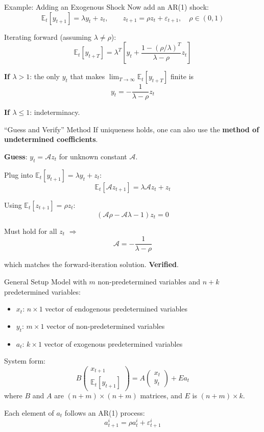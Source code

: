 \documentclass[blue]{beamer}
\newcommand{\E}{\mathbb{E}}
\begin{document}
\begin{frame}{Example: Adding an Exogenous Shock}
	Now add an AR(1) shock:
	\[
	\E_t[y_{t+1}] = \lambda y_t + z_t, \qquad z_{t+1} = \rho z_t + \varepsilon_{t+1}, \quad \rho \in (0, 1)
	\]
	
	\bigskip
	Iterating forward (assuming $\lambda \neq \rho$):
	\[
	\E_t[y_{t+T}] = \lambda^T \left[y_t + \frac{1 - (\rho/\lambda)^T}{\lambda - \rho} z_t\right]
	\]
	
	\bigskip
	\textbf{If $\lambda > 1$}: the only $y_t$ that makes $\lim_{T\rightarrow \infty} \E_t[y_{t+T}]$ finite is
	\[
	y_t = -\frac{1}{\lambda - \rho} z_t
	\]
	
	\textbf{If $\lambda \leq 1$}: indeterminacy.
\end{frame}


\begin{frame}{``Guess and Verify'' Method}
	If uniqueness holds, one can also use the \textbf{method of undetermined coefficients}.
	
	\bigskip
	\textbf{Guess}: $y_t = \mathcal{A} z_t$ for unknown constant $\mathcal{A}$.
	
	\bigskip
	Plug into $\E_t[y_{t+1}] = \lambda y_t + z_t$:
	\[
	 \E_t[\mathcal{A}z_{t+1}] = \lambda \mathcal{A}z_t + z_t
	\]
	
	\bigskip
	Using $\E_t[z_{t+1}] = \rho z_t$:
	\[
	(\mathcal{A}\rho - \mathcal{A}\lambda - 1) z_t = 0
	\]
	
	\bigskip
	Must hold for all $z_t$ $\Rightarrow$
	\[
	\mathcal{A} = -\frac{1}{\lambda - \rho}
	\]
	
	which matches the forward-iteration solution. \textbf{Verified}.
\end{frame}

\begin{frame}{General Setup}
	Model with $m$ non-predetermined variables and $n + k$ predetermined variables:
	\begin{itemize}
		\item $x_t$: $n \times 1$ vector of endogenous predetermined variables
		\item $y_t$: $m \times 1$ vector of non-predetermined variables
		\item $a_t$: $k \times 1$ vector of exogenous predetermined variables
	\end{itemize}
	
	System form:
	\[
	B \begin{pmatrix} x_{t+1} \\ \E_t[y_{t+1}] \end{pmatrix} = A \begin{pmatrix} x_t \\ y_t \end{pmatrix} + E a_t
	\]
		where $B$ and $A$ are $(n+m) \times (n+m)$ matrices, and $E$ is $(n+m) \times k$.
	

	Each element of $a_t$ follows an AR(1) process:
	\[
	a^i_{t+1} = \rho a^i_t + \varepsilon^i_{t+1}
	\]
\end{frame}
\end{document}
